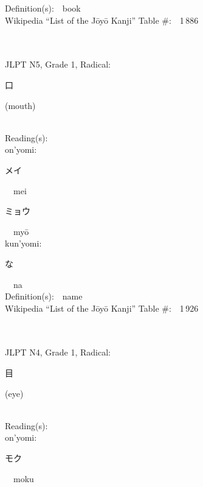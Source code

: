 \begin{multicols}{2}
Definition(s):\ \ book \\
Wikipedia ``List of the J\=oy\=o Kanji'' Table \#:\ \ 1\,886 \\
\ \ \\
{\fontsize{34pt}{40pt}  }\ \ \\  %
{JLPT N5, Grade 1, Radical:\ \ {\begin{CJK}{UTF8}{min} 口 \end{CJK}} (mouth) } \\
Reading(s):\ \ \\
{\hspace*{1em}}on'yomi:\ \ \\
{\hspace*{2em}}{\begin{CJK}{UTF8}{min} メイ \end{CJK}}\ \ mei\ \ \\
{\hspace*{2em}}{\begin{CJK}{UTF8}{min} ミョウ \end{CJK}}\ \ my\=o\ \ \\
{\hspace*{1em}}kun'yomi:\ \ \\
{\hspace*{2em}}{\begin{CJK}{UTF8}{min} な \end{CJK}}\ \ na\ \ \\
Definition(s):\ \ name \\
Wikipedia ``List of the J\=oy\=o Kanji'' Table \#:\ \ 1\,926 \\
\ \ \\
{\fontsize{34pt}{40pt}  }\ \ \\  %
{JLPT N4, Grade 1, Radical:\ \ {\begin{CJK}{UTF8}{min} 目 \end{CJK}} (eye) } \\
Reading(s):\ \ \\
{\hspace*{1em}}on'yomi:\ \ \\
{\hspace*{2em}}{\begin{CJK}{UTF8}{min} モク \end{CJK}}\ \ moku\ \ \\

\end{multicols}
